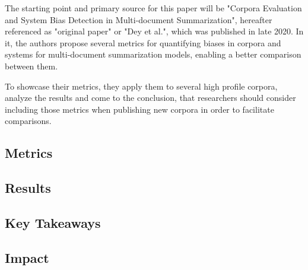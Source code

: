 \documentclass[../main.tex]{subfiles}
\begin{document}
The starting point and primary source for this paper will be
"Corpora Evaluation and System Bias Detection in Multi-document Summarization"\cite{dey-etal-2020-corpora}, hereafter referenced as "original paper" or "Dey et al.", which was published in late 2020.
In it, the authors propose several metrics for quantifying biases in corpora and systems for multi-document summarization models, enabling a better comparison between them.

To showcase their metrics, they apply them to several high profile corpora, analyze the results and come to the conclusion, that researchers should consider including those metrics when publishing new corpora in order to facilitate comparisons.

\subsection{Metrics}
\label{sec:metrics}


\subsection{Results}
\label{sec:results}


\subsection{Key Takeaways}
\label{sec:takewawys}


\subsection{Impact}
\label{sec:impact}

\end{document}
